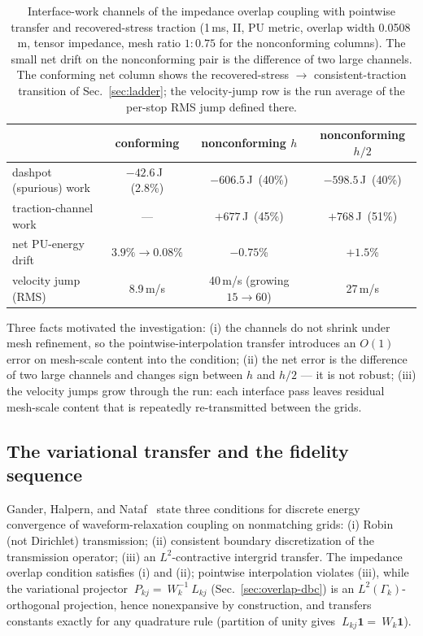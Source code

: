 \documentclass[11pt]{article}
\begin{document}
\begin{table}[htbp]
\centering
\small
\caption{Interface-work channels of the impedance overlap coupling with
pointwise transfer and recovered-stress traction (1\,ms, II, PU metric,
overlap width 0.0508\,m, tensor impedance, mesh ratio $1{:}0.75$ for the
nonconforming columns). The small net drift on the nonconforming pair is
the difference of two large channels. The conforming net column shows the
recovered-stress $\to$ consistent-traction transition of
Sec.~\ref{sec:ladder}; the velocity-jump row is the run average of the
per-stop RMS jump defined there.}
\label{tab:channels-fidelity}
\begin{tabular}{lccc}
\toprule
& conforming & nonconforming $h$ & nonconforming $h/2$ \\
\midrule
dashpot (spurious) work & $-42.6$\,J \,(2.8\%) & $-606.5$\,J \,(40\%) & $-598.5$\,J \,(40\%) \\
traction-channel work & --- & $+677$\,J \,(45\%) & $+768$\,J \,(51\%) \\
net PU-energy drift & $3.9\% \to 0.08\%$ & $-0.75$\% & $+1.5$\% \\
velocity jump (RMS) & 8.9\,m/s & 40\,m/s (growing $15 \to 60$) & 27\,m/s \\
\bottomrule
\end{tabular}
\end{table}

Three facts motivated the investigation: (i) the channels do not shrink under
mesh refinement, so the pointwise-interpolation transfer introduces
an $O(1)$ error on mesh-scale content into the condition; (ii) the net error is the difference
of two large channels and changes sign between $h$ and $h/2$ --- it is not
robust; (iii) the velocity jumps grow through the run: each interface pass
leaves residual mesh-scale content that is repeatedly re-transmitted
between the grids.

\subsection{The variational transfer and the fidelity sequence}
\label{sec:fidelity-ladder}

Gander, Halpern, and Nataf~\cite{GanderHalpernNataf2003} state three
conditions for discrete energy convergence of waveform-relaxation coupling
on nonmatching grids: (i) Robin
(not Dirichlet) transmission; (ii) consistent boundary discretization of the
transmission operator; (iii) an $L^2$-contractive intergrid transfer. The
impedance overlap condition satisfies (i) and (ii); pointwise interpolation
violates (iii), while the variational projector
$~P_{kj} = ~W_k^{-1}~L_{kj}$ (Sec.~\ref{sec:overlap-dbc}) is an
$L^2(\Gamma_k)$-orthogonal projection, hence nonexpansive by construction,
and transfers constants exactly for any quadrature rule (partition of unity
gives $~L_{kj}\mathbf{1} = ~W_k\mathbf{1}$).
\end{document}
